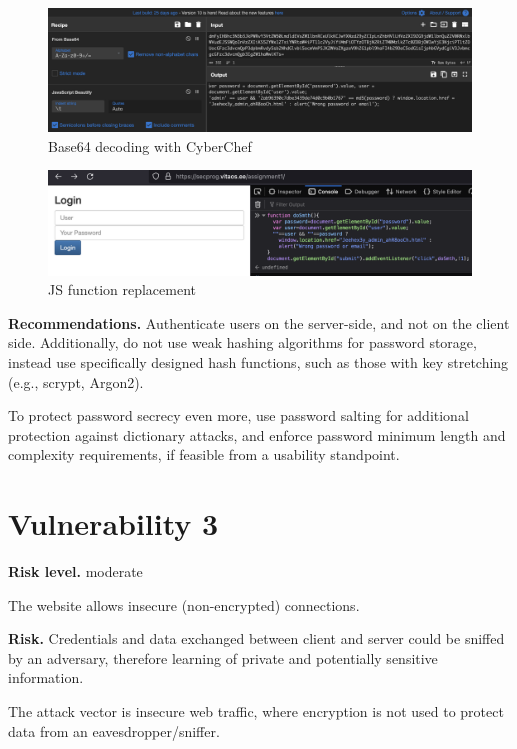 \documentclass[parskip=half]{scrartcl}
\begin{document}
\begin{figure}
  \centering
  \includegraphics[width=\textwidth]{b64decode}
  \caption{Base64 decoding with CyberChef}
  \label{fig:b64decode}
\end{figure}

\begin{figure}
  \centering
  \includegraphics[width=\textwidth]{jsattack}
  \caption{JS function replacement}
  \label{fig:jsattack}
\end{figure}

\textbf{Recommendations.} Authenticate users on the server-side, and not on the
client side. Additionally, do not use weak hashing algorithms for password
storage, instead use specifically designed hash functions, such as those with
key stretching (e.g., scrypt, Argon2).

To protect password secrecy even more, use password salting for additional
protection against dictionary attacks, and enforce password minimum length and
complexity requirements, if feasible from a usability standpoint.

\section*{Vulnerability 3}

\textbf{Risk level.} moderate

The website allows insecure (non-encrypted) connections.

\textbf{Risk.} Credentials and data exchanged between client and server could
be sniffed by an adversary, therefore learning of private and potentially
sensitive information.

The attack vector is insecure web traffic, where encryption is not used to
protect data from an eavesdropper/sniffer.
\end{document}
